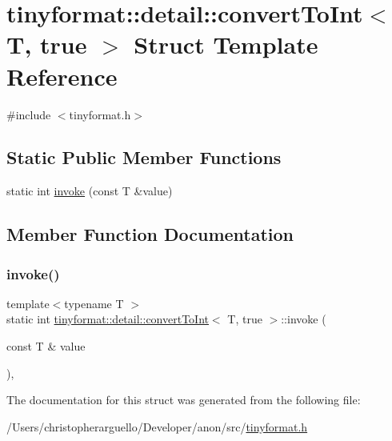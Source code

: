 \hypertarget{structtinyformat_1_1detail_1_1convert_to_int_3_01_t_00_01true_01_4}{}\section{tinyformat\+:\+:detail\+:\+:convert\+To\+Int$<$ T, true $>$ Struct Template Reference}
\label{structtinyformat_1_1detail_1_1convert_to_int_3_01_t_00_01true_01_4}


{\ttfamily \#include $<$tinyformat.\+h$>$}

\subsection*{Static Public Member Functions}
\begin{DoxyCompactItemize}
\item 
static int \mbox{\hyperlink{structtinyformat_1_1detail_1_1convert_to_int_3_01_t_00_01true_01_4_a7d03793b995eb4428bb13349004f5fcd}{invoke}} (const T \&value)
\end{DoxyCompactItemize}


\subsection{Member Function Documentation}
\mbox{\label{structtinyformat_1_1detail_1_1convert_to_int_3_01_t_00_01true_01_4_a7d03793b995eb4428bb13349004f5fcd}} 
\subsubsection{\texorpdfstring{invoke()}{invoke()}}
{\footnotesize\ttfamily template$<$typename T $>$ \\
static int \mbox{\hyperlink{structtinyformat_1_1detail_1_1convert_to_int}{tinyformat\+::detail\+::convert\+To\+Int}}$<$ T, true $>$\+::invoke (\begin{DoxyParamCaption}\item[{const T \&}]{value }\end{DoxyParamCaption})\hspace{0.3cm}{\ttfamily [inline]}, {\ttfamily [static]}}



The documentation for this struct was generated from the following file\+:\begin{DoxyCompactItemize}
\item 
/\+Users/christopherarguello/\+Developer/anon/src/\mbox{\hyperlink{tinyformat_8h}{tinyformat.\+h}}\end{DoxyCompactItemize}
